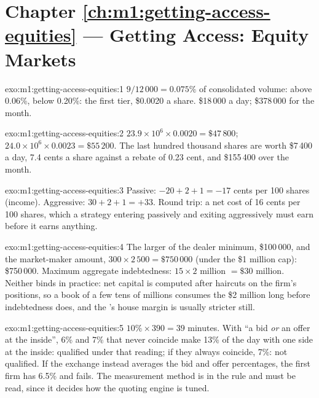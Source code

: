 \section*{Chapter \ref{ch:m1:getting-access-equities} --- Getting Access: Equity Markets}

\begin{solution}{exo:m1:getting-access-equities:1}
$9/12\,000 = 0.075\%$ of consolidated volume: above 0.06\%, below 0.20\%: the
first tier, \$0.0020 a share. \$18\,000 a day; \$378\,000 for the month.
\end{solution}

\begin{solution}{exo:m1:getting-access-equities:2}
$23.9 \times 10^6 \times 0.0020 = \$47\,800$; $24.0 \times 10^6 \times 0.0023 =
\$55\,200$. The last hundred thousand shares are worth \$7\,400 a day, 7.4 cents
a share against a rebate of 0.23 cent, and \$155\,400 over the month.
\end{solution}

\begin{solution}{exo:m1:getting-access-equities:3}
Passive: $-20 + 2 + 1 = -17$ cents per 100 shares (income). Aggressive: $30 + 2
+ 1 = +33$. Round trip: a net cost of 16 cents per 100 shares, which a
strategy entering passively and exiting aggressively must earn before it
earns anything.
\end{solution}

\begin{solution}{exo:m1:getting-access-equities:4}
The larger of the dealer minimum, \$100\,000, and the market-maker amount, $300
\times 2\,500 = \$750\,000$ (under the \$1 million cap): \$750\,000. Maximum
aggregate indebtedness: $15 \times 2$ million $= \$30$ million. Neither binds in
practice: net capital is computed after haircuts on the firm's positions, so
a book of a few tens of millions consumes the \$2 million long before
indebtedness does, and the 's house margin is usually
stricter still.
\end{solution}

\begin{solution}{exo:m1:getting-access-equities:5}
$10\% \times 390 = 39$ minutes. With ``a bid \emph{or} an offer at the inside'',
6\% and 7\% that never coincide make 13\% of the day with one side at the
inside: qualified under that reading; if they always coincide, 7\%: not
qualified. If the exchange instead averages the bid and offer percentages,
the first firm has 6.5\% and fails. The measurement method is in the rule and
must be read, since it decides how the quoting engine is tuned.
\end{solution}

